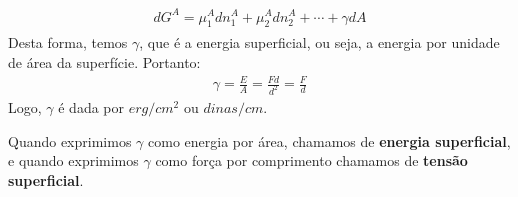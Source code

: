 \begin{multicols*}{2}
\begin{definition}
    \begin{gather}
      \begin{aligned}
        dG^{A} = \mu_1^{A} dn_1^{A} + \mu_2^{A} dn_2^{A} + \cdots + \gamma dA 
      \end{aligned}
    \end{gather}
    Desta forma, temos $\gamma$, que é a energia superficial, ou seja, a energia por unidade de área da superfície. Portanto:
    \begin{gather}
      \gamma = \frac{E}{A} = \frac{F d}{d^2} = \frac{F}{d}
    \end{gather}
    Logo, $\gamma$ é dada por $erg/cm^2$ ou $dinas/cm$. 
  \end{definition}
  \begin{remark}
    Quando exprimimos $\gamma$ como energia por área, chamamos de \textbf{energia superficial}, e quando exprimimos $\gamma$ como força por comprimento chamamos de \textbf{tensão superficial}.
  \end{remark}

\end{multicols*}
